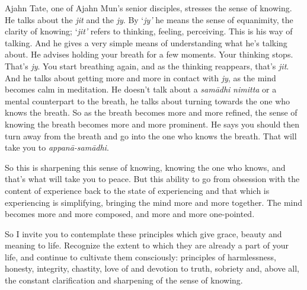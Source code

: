 Ajahn Tate, one of Ajahn Mun's senior disciples, stresses the sense of
knowing. He talks about the \emph{jit} and the \emph{jy}. By `\emph{jy'}
he means the sense of equanimity, the clarity of knowing; `\emph{jit'}
refers to thinking, feeling, perceiving. This is his way of talking. And
he gives a very simple means of understanding what he's talking about.
He advises holding your breath for a few moments. Your thinking stops.
That's \emph{jy}. You start breathing again, and as the thinking
reappears, that's \emph{jit}. And he talks about getting more and more
in contact with \emph{jy}, as the mind becomes calm in meditation. He
doesn't talk about a \emph{samādhi} \emph{nimitta} or a mental
counterpart to the breath, he talks about turning towards the one who
knows the breath. So as the breath becomes more and more refined, the
sense of knowing the breath becomes more and more prominent. He says you
should then turn away from the breath and go into the one who knows the
breath. That will take you to \emph{appanā-samādhi}.

So this is sharpening this sense of knowing, knowing the one who knows,
and that's what will take you to peace. But this ability to go from
obsession with the content of experience back to the state of
experiencing and that which is experiencing is simplifying, bringing the
mind more and more together. The mind becomes more and more composed,
and more and more one-pointed.

So I invite you to contemplate these principles which give grace, beauty
and meaning to life. Recognize the extent to which they are already a
part of your life, and continue to cultivate them consciously:
principles of harmlessness, honesty, integrity, chastity, love of and
devotion to truth, sobriety and, above all, the constant clarification
and sharpening of the sense of knowing.

